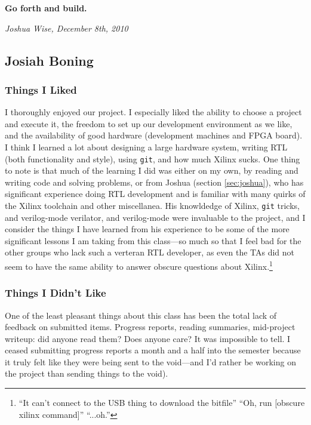 \documentclass[10pt]{report}
\begin{document}
\textbf{Go forth and build.}

\hfill\textit{Joshua Wise, December 8th, 2010}

\subsection{Josiah Boning}
\label{sec:josiah}

\subsubsection{Things I Liked}

I thoroughly enjoyed our project. I especially liked  the ability to choose 
a project and execute it, the freedom to set up our development environment 
as we like, and the availability of good hardware (development machines and 
FPGA board). I think I learned a lot about designing a large hardware system,
writing RTL (both functionality and style), using \texttt{git}, and how much 
Xilinx sucks. 
One thing to note is that much of the learning I did was either on my own, 
by reading and writing code and solving problems, or from Joshua (section 
\ref{sec:joshua}), who has significant experience doing RTL development and 
is familiar with many quirks of the Xilinx toolchain and other miscellanea. 
His knowldedge of Xilinx, \texttt{git} tricks, and verilog-mode verilator, 
and verilog-mode were invaluable to the project, and I consider the things I 
have learned from his experience to be some of the more significant lessons 
I am taking from this class---so much so that I feel bad for the other groups 
who lack such a verteran RTL developer, as even the TAs did not seem to have 
the same ability to answer obscure questions about Xilinx.\footnote{``It can't 
connect to the USB thing to download the bitfile'' ``Oh, run [obscure xilinx 
command]'' ``...oh.''}

\subsubsection{Things I Didn't Like}

One of the least pleasant things about this class has been the total lack of 
feedback on submitted items. Progress reports, reading summaries, mid-project 
writeup: did anyone read them? Does anyone care? It was impossible to tell. I 
ceased submitting progress reports a month and a half into the semester because 
it truly felt like they were being sent to the void---and I'd rather be working 
on the project than sending things to the void).
\end{document}

